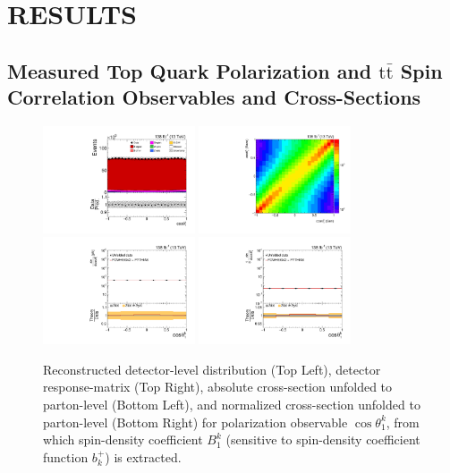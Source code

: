 
\chapter{RESULTS}
\label{Results}

\section{Measured Top Quark Polarization and \ensuremath{\mathrm{t\bar{t}}} Spin Correlation Observables and Cross-Sections}

\begin{figure}[htb]
\begin{center}
 \includegraphics[width=0.40\textwidth]{fig_fullRun2UL/controlplots/combined/Hyp_AntiLeptonBk.pdf}
 \includegraphics[width=0.40\textwidth]{fig_fullRun2UL/unfolding/combined/ResponseMatrix_b1k.pdf} \\
 \includegraphics[width=0.40\textwidth]{fig_fullRun2UL/unfolding/combined/UnfoldedResults_b1k.pdf}
 \includegraphics[width=0.40\textwidth]{fig_fullRun2UL/unfolding/combined/UnfoldedResultsNorm_b1k.pdf} \\
\label{fig:b1k}
\caption{Reconstructed detector-level distribution (Top Left), detector response-matrix (Top Right), absolute cross-section unfolded to parton-level (Bottom Left), and normalized cross-section unfolded to parton-level (Bottom Right) for polarization observable $\cos\theta_{1}^{k}$, from which spin-density coefficient $B_{1}^{k}$ (sensitive to spin-density coefficient function $b_k^{+}$) is extracted.}
\end{center}
\end{figure}
